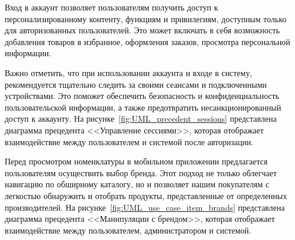 



Вход в аккаунт позволяет пользователям получить доступ к персонализированному контенту, функциям и привилегиям,
доступным только для авторизованных пользователей.
Это может включать в себя возможность добавления товаров в избранное, оформления заказов,
просмотра персональной информации.

Важно отметить, что при использовании аккаунта и входе в систему,
рекомендуется тщательно следить за своими сеансами и подключенными устройствами.
Это поможет обеспечить безопасность и конфиденциальность пользовательской информации,
а также предотвратить несанкционированный доступ к аккаунту.
На рисунке~\ref{fig:UML_precedent_sessions} представлена диаграмма прецедента <<Управление сессиями>>,
которая отображает взаимодействие между пользователем и системой после авторизации.





Перед просмотром номенклатуры в мобильном приложении предлагается пользователям осуществить выбор бренда.
Этот подход не только облегчает навигацию по обширному каталогу,
но и позволяет нашим покупателям с легкостью обнаружить и отобрать продукты,
представленные от определенных производителей.
На рисунке~\ref{fig:UML_use_case_item_brands} представлена диаграмма прецедента <<Манипуляции с брендом>>,
которая отображает взаимодействие между пользователем, администратором и системой.




